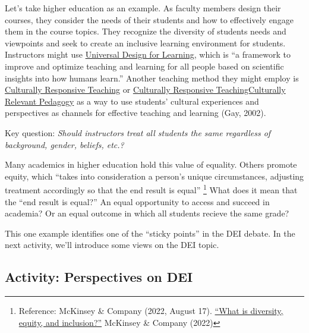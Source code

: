 \documentclass[
]{book}
\theoremstyle{definition}
\theoremstyle{definition}
\theoremstyle{definition}
\theoremstyle{definition}
\theoremstyle{remark}
\begin{document}
Let's take higher education as an example. As faculty members design their courses, they consider the needs of their students and how to effectively engage them in the course topics. They recognize the diversity of students needs and viewpoints and seek to create an inclusive learning environment for students. Instructors might use \href{https://udlguidelines.cast.org/}{Universal Design for Learning}, which is ``a framework to improve and optimize teaching and learning for all people based on scientific insights into how humans learn.'' Another teaching method they might employ is \href{https://www.facultyfocus.com/articles/equality-inclusion-and-diversity/five-essential-strategies-to-embrace-culturally-responsive-teaching/}{Culturally Responsive Teaching} or \href{http://www.inclusioncanada.net/culturallyrelevantpedagogy.html}{Culturally Responsive TeachingCulturally Relevant Pedagogy} as a way to use students' cultural experiences and perspectives as channels for effective teaching and learning (Gay, 2002).

Key question: \emph{Should instructors treat all students the same regardless of background, gender, beliefs, etc.?}

Many academics in higher education hold this value of equality. Others promote equity, which ``takes into consideration a person's unique circumstances, adjusting treatment accordingly so that the end result is equal'' \footnote{Reference: McKinsey \& Company (2022, August 17). \href{https://www.mckinsey.com/featured-insights/mckinsey-explainers/what-is-diversity-equity-and-inclusion}{``What is diversity, equity, and inclusion?''} McKinsey \& Company (2022)}
What does it mean that the ``end result is equal?'' An equal opportunity to access and succeed in academia? Or an equal outcome in which all students recieve the same grade?

This one example identifies one of the ``sticky points'' in the DEI debate. In the next activity, we'll introduce some views on the DEI topic.

\hypertarget{activity-perspectives-on-dei}{%
\subsection*{Activity: Perspectives on DEI}\label{activity-perspectives-on-dei}}
\end{document}
